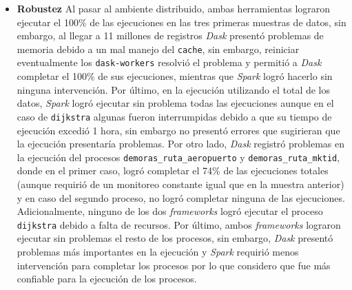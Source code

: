 \begin{itemize}
	
	\item \textbf{Robustez} Al pasar al ambiente distribuido, ambas herramientas lograron ejecutar el 100\% de las ejecuciones en las tres primeras muestras de datos, sin embargo, al llegar a 11 millones de registros \textit{Dask} presentó problemas de memoria debido a un mal manejo del \texttt{cache}, sin embargo, reiniciar eventualmente los \texttt{dask-workers} resolvió el problema y permitió a \textit{Dask} completar el 100\% de sus ejecuciones, mientras que \textit{Spark} logró hacerlo sin ninguna intervención. Por último, en la ejecución utilizando el total de los datos, \textit{Spark} logró ejecutar sin problema todas las ejecuciones aunque en el caso de \texttt{dijkstra} algunas fueron interrumpidas debido a que su tiempo de ejecución excedió 1 hora, sin embargo no presentó errores que sugirieran que la ejecución presentaría problemas. Por otro lado, \textit{Dask} registró problemas en la ejecución del procesos \texttt{demoras\_ruta\_aeropuerto} y \texttt{demoras\_ruta\_mktid}, donde en el primer caso, logró completar el 74\% de las ejecuciones totales (aunque requirió de un monitoreo constante igual que en la muestra anterior) y en caso del segundo proceso, no logró completar ninguna de las ejecuciones. Adicionalmente, ninguno de los dos \textit{frameworks} logró ejecutar el proceso \texttt{dijkstra} debido a falta de recursos. Por último, ambos \textit{frameworks} lograron ejecutar sin problemas el resto de los procesos, sin embargo, \textit{Dask} presentó problemas más importantes en la ejecución y \textit{Spark} requirió menos intervención para completar los procesos por lo que considero que fue más confiable para la ejecución de los procesos.
	

\end{itemize}
